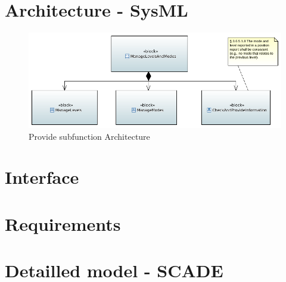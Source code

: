 

\section{Architecture - SysML}


\begin{landscape}
\begin{figure}[hbtp]
\centering
\includegraphics[scale=1]{../SysML/FunctionalArchitecture.png}
\caption{Provide subfunction Architecture}
\end{figure}
\end{landscape}


\section{Interface}

\section{Requirements}

\section{Detailled model - SCADE}

